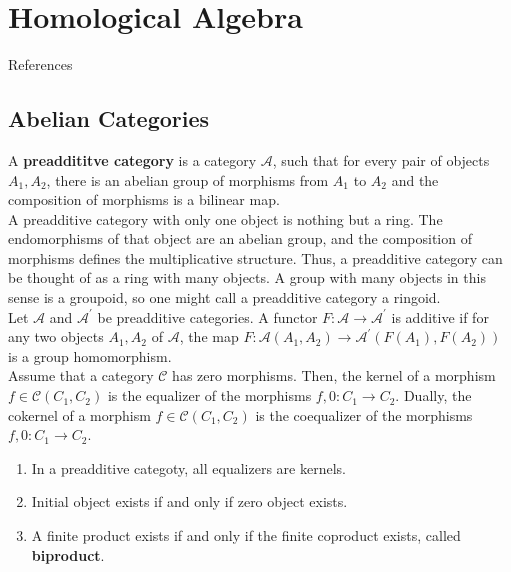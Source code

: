 \chapter{Homological Algebra}

References \cite{richterCategoriesHomotopyTheory2020,weibelKbookIntroductionAlgebraic2013a}
\section{Abelian Categories}




A \textbf{preaddititve category} is a category $\mathcal{A}$, such that for every pair of objects $A_1, A_2$, there is an abelian group of morphisms from $A_1$ to $A_2$ and the composition of morphisms is a bilinear map.\\
A preadditive category with only one object is nothing but a ring. The endomorphisms of that object are an abelian group, and the composition of morphisms defines the multiplicative structure. Thus, a preadditive category can be thought of as a ring with many objects. A group with many objects in this sense is a groupoid, so one might call a preadditive category a ringoid.\\
Let $\mathcal{A}$ and $\mathcal{A}^{\prime}$ be preadditive categories. A functor $F: \mathcal{A} \rightarrow \mathcal{A}^{\prime}$ is additive if for any two objects $A_1, A_2$ of $\mathcal{A}$, the map $F: \mathcal{A}\left(A_1, A_2\right) \rightarrow \mathcal{A}^{\prime}\left(F\left(A_1\right), F\left(A_2\right)\right)$ is a group homomorphism.\\

Assume that a category $\mathcal{C}$ has zero morphisms. Then, the kernel of a morphism $f \in \mathcal{C}\left(C_1, C_2\right)$ is the equalizer of the morphisms $f, 0: C_1 \rightarrow C_2$. Dually, the cokernel of a morphism $f \in \mathcal{C}\left(C_1, C_2\right)$ is the coequalizer of the morphisms $f, 0: C_1 \rightarrow C_2$.

\begin{prop}
    \begin{enumerate}
        \item In a preadditive categoty, all equalizers are kernels.
        \item Initial object exists if and only if zero object exists.
        \item A finite product exists if and only if the finite coproduct exists, called \textbf{biproduct}.
    \end{enumerate}
\end{prop}

